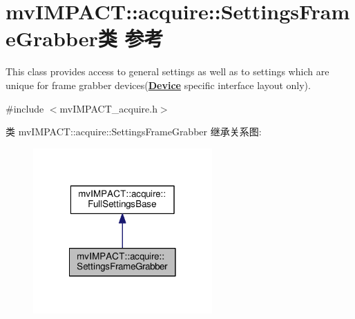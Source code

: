 \hypertarget{classmv_i_m_p_a_c_t_1_1acquire_1_1_settings_frame_grabber}{\section{mv\+I\+M\+P\+A\+C\+T\+:\+:acquire\+:\+:Settings\+Frame\+Grabber类 参考}
\label{classmv_i_m_p_a_c_t_1_1acquire_1_1_settings_frame_grabber}
}


This class provides access to general settings as well as to settings which are unique for frame grabber devices({\bfseries \hyperlink{classmv_i_m_p_a_c_t_1_1acquire_1_1_device}{Device}} specific interface layout only).  




{\ttfamily \#include $<$mv\+I\+M\+P\+A\+C\+T\+\_\+acquire.\+h$>$}



类 mv\+I\+M\+P\+A\+C\+T\+:\+:acquire\+:\+:Settings\+Frame\+Grabber 继承关系图\+:
\nopagebreak
\begin{figure}[H]
\begin{center}
\leavevmode
\includegraphics[width=194pt]{classmv_i_m_p_a_c_t_1_1acquire_1_1_settings_frame_grabber__inherit__graph}
\end{center}
\end{figure}



